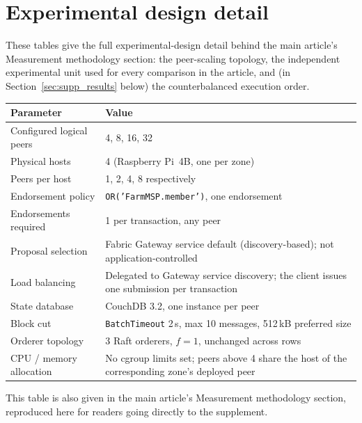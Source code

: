 \clearpage
\section{Experimental design detail}
\label{sec:supp_design}

These tables give the full experimental-design detail behind the main
article's Measurement methodology section: the peer-scaling topology, the
independent experimental unit used for every comparison in the article,
and (in Section~\ref{sec:supp_results} below) the counterbalanced
execution order.

\begin{widetab}
\caption{Topology and routing used for each peer-scaling configuration.}
\label{tab:topology}
\small
\begin{tabularx}{\tblwidth}{@{}lX@{}}
\toprule
Parameter & Value \\
\midrule
Configured logical peers  & 4, 8, 16, 32 \\
Physical hosts            & 4 (Raspberry Pi~4B, one per zone) \\
Peers per host            & 1, 2, 4, 8 respectively \\
Endorsement policy        & \texttt{OR('FarmMSP.member')}, one endorsement \\
Endorsements required     & 1 per transaction, any peer \\
Proposal selection        & Fabric Gateway service default (discovery-based);
                            not application-controlled \\
Load balancing            & Delegated to Gateway service discovery; the
                            client issues one submission per transaction \\
State database            & CouchDB 3.2, one instance per peer \\
Block cut                 & \texttt{BatchTimeout} 2\,s, max 10 messages,
                            512\,kB preferred size \\
Orderer topology          & 3 Raft orderers, $f{=}1$, unchanged across rows \\
CPU / memory allocation   & No cgroup limits set; peers above 4 share the
                            host of the corresponding zone's deployed peer \\
\bottomrule
\end{tabularx}
\end{widetab}

This table is also given in the main article's Measurement methodology
section, reproduced here for readers going directly to the supplement.


